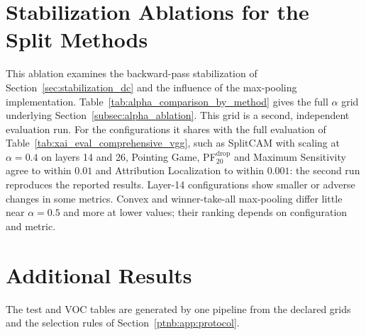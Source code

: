 \section{Stabilization Ablations for the Split Methods}\label{app:ablation}

This ablation examines the backward-pass stabilization of Section~\ref{sec:stabilization_dc} and the influence of the max-pooling implementation.\label{app:backward_ablation} Table~\ref{tab:alpha_comparison_by_method} gives the full $\alpha$ grid underlying Section~\ref{subsec:alpha_ablation}. This grid is a second, independent evaluation run. For the configurations it shares with the full evaluation of Table~\ref{tab:xai_eval_comprehensive_vgg}, such as SplitCAM with scaling at $\alpha=0.4$ on layers 14 and 26, Pointing Game, PF$^{\mathrm{drop}}_{20}$ and Maximum Sensitivity agree to within $0.01$ and Attribution Localization to within $0.001$: the second run reproduces the reported results. Layer-14 configurations show smaller or adverse changes in some metrics. Convex and winner-take-all max-pooling differ little near $\alpha=0.5$ and more at lower values; their ranking depends on configuration and metric.



\section{Additional Results}\label{ptnb:app:results}

The test and VOC tables are generated by one pipeline from the declared grids and the selection rules of Section~\ref{ptnb:app:protocol}.

